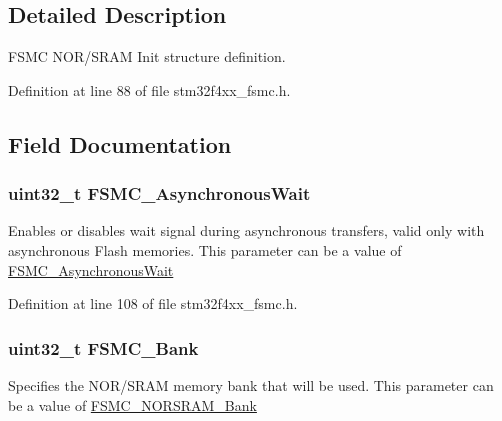 \subsection{Detailed Description}
F\-S\-M\-C N\-O\-R/\-S\-R\-A\-M Init structure definition. 

Definition at line 88 of file stm32f4xx\-\_\-fsmc.\-h.



\subsection{Field Documentation}
\hypertarget{struct_f_s_m_c___n_o_r_s_r_a_m_init_type_def_a9178fc2849ddd6277a0dd2655c8b600c}{
\subsubsection[{F\-S\-M\-C\-\_\-\-Asynchronous\-Wait}]{\setlength{\rightskip}{0pt plus 5cm}uint32\-\_\-t F\-S\-M\-C\-\_\-\-Asynchronous\-Wait}}\label{struct_f_s_m_c___n_o_r_s_r_a_m_init_type_def_a9178fc2849ddd6277a0dd2655c8b600c}
Enables or disables wait signal during asynchronous transfers, valid only with asynchronous Flash memories. This parameter can be a value of \hyperlink{group___f_s_m_c___asynchronous_wait}{F\-S\-M\-C\-\_\-\-Asynchronous\-Wait} 

Definition at line 108 of file stm32f4xx\-\_\-fsmc.\-h.

\hypertarget{struct_f_s_m_c___n_o_r_s_r_a_m_init_type_def_a787e4c845195c81c7326893451a2fc6f}{
\subsubsection[{F\-S\-M\-C\-\_\-\-Bank}]{\setlength{\rightskip}{0pt plus 5cm}uint32\-\_\-t F\-S\-M\-C\-\_\-\-Bank}}\label{struct_f_s_m_c___n_o_r_s_r_a_m_init_type_def_a787e4c845195c81c7326893451a2fc6f}
Specifies the N\-O\-R/\-S\-R\-A\-M memory bank that will be used. This parameter can be a value of \hyperlink{group___f_s_m_c___n_o_r_s_r_a_m___bank}{F\-S\-M\-C\-\_\-\-N\-O\-R\-S\-R\-A\-M\-\_\-\-Bank} 

